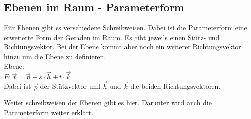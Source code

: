 \subsection{Ebenen im Raum - Parameterform}
Für Ebenen gibt es verschiedene Schreibweisen. 
Dabei ist die Parameterform eine erweiterte Form der Geraden im Raum.
Es gibt jeweils einen Stütz- und Richtungsvektor. 
Bei der Ebene kommt aber noch ein weiterer Richtungsvektor hinzu um die Ebene zu definieren.
\\
Ebene: \\
$
E: \vec{x} = 
\vec{p} + s\cdot\vec{h} + t\cdot\vec{k}
$
\\
Dabei ist $\vec{p}$ der Stützvektor und $\vec{h}$ und $\vec{k}$ die beiden Richtungsvektoren.
\par
Weiter schreibweisen der Ebenen gibt es \hyperref[sec:ebenen_formen]{hier}. 
Darunter wird auch die Parameterform weiter erklärt.

